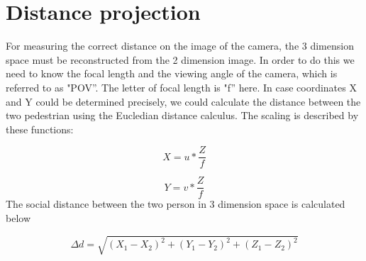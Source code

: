 \section{Distance projection}
For measuring the correct distance on the image of the camera, the 3 dimension space must be reconstructed from the 2 dimension image.  In order to do this we need to know the focal length and the viewing angle of the camera, which is referred to as "POV”. The letter of focal length is "f” here. In case coordinates X and Y could be determined precisely, we could calculate the distance between the two pedestrian using the Eucledian distance calculus. The scaling is described by these functions:

\begin{equation}
    X = u*\frac{Z}{f}
\end{equation}

\begin{equation}
    Y = v*\frac{Z}{f}
\end{equation}
The social distance between the two person in 3 dimension space is calculated below

\begin{equation}
    \Delta d=\sqrt{(X_{1}-X_{2})^2 + (Y_{1}-Y_{2})^2+(Z_{1}-Z_{2})^2}
\end{equation}

